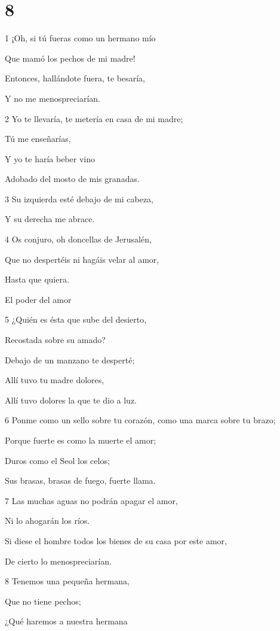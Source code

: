 \chapter{8}

\par 1 ¡Oh, si tú fueras como un hermano mío
\par Que mamó los pechos de mi madre!
\par Entonces, hallándote fuera, te besaría,
\par Y no me menospreciarían.
\par 2 Yo te llevaría, te metería en casa de mi madre;
\par Tú me enseñarías,
\par Y yo te haría beber vino
\par Adobado del mosto de mis granadas.
\par 3 Su izquierda esté debajo de mi cabeza,
\par Y su derecha me abrace.
\par 4 Os conjuro, oh doncellas de Jerusalén,
\par Que no despertéis ni hagáis velar al amor,
\par Hasta que quiera.
\par El poder del amor
\par 5 ¿Quién es ésta que sube del desierto,
\par Recostada sobre su amado?
\par Debajo de un manzano te desperté;
\par Allí tuvo tu madre dolores,
\par Allí tuvo dolores la que te dio a luz.
\par 6 Ponme como un sello sobre tu corazón, como una marca sobre tu brazo;
\par Porque fuerte es como la muerte el amor;
\par Duros como el Seol los celos;
\par Sus brasas, brasas de fuego, fuerte llama.
\par 7 Las muchas aguas no podrán apagar el amor,
\par Ni lo ahogarán los ríos.
\par Si diese el hombre todos los bienes de su casa por este amor,
\par De cierto lo menospreciarían.
\par 8 Tenemos una pequeña hermana,
\par Que no tiene pechos;
\par ¿Qué haremos a nuestra hermana

